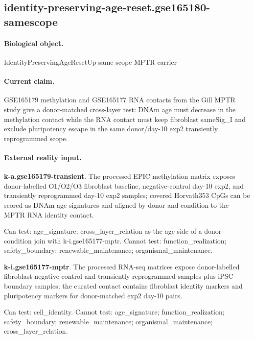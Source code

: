 \subsection{identity-preserving-age-reset.gse165180-samescope}

\paragraph{Biological object.} IdentityPreservingAgeResetUp same-scope MPTR carrier

\paragraph{Current claim.} GSE165179 methylation and GSE165177 RNA contacts from the Gill MPTR study give a donor-matched cross-layer test: DNAm age must decrease in the methylation contact while the RNA contact must keep fibroblast sameSig\_I and exclude pluripotency escape in the same donor/day-10 exp2 transiently reprogrammed scope.

\paragraph{External reality input.}
\textbf{k-a.gse165179-transient}. The processed EPIC methylation matrix exposes donor-labelled O1/O2/O3 fibroblast baseline, negative-control day-10 exp2, and transiently reprogrammed day-10 exp2 samples; covered Horvath353 CpGs can be scored as DNAm age signatures and aligned by donor and condition to the MPTR RNA identity contact.

Can test: age\_signature; cross\_layer\_relation as the age side of a donor-condition join with k-i.gse165177-mptr. Cannot test: function\_realization; safety\_boundary; renewable\_maintenance; organismal\_maintenance.

\textbf{k-i.gse165177-mptr}. The processed RNA-seq matrices expose donor-labelled fibroblast negative-control and transiently reprogrammed samples plus iPSC boundary samples; the curated contact contains fibroblast identity markers and pluripotency markers for donor-matched exp2 day-10 pairs.

Can test: cell\_identity. Cannot test: age\_signature; function\_realization; safety\_boundary; renewable\_maintenance; organismal\_maintenance; cross\_layer\_relation.

